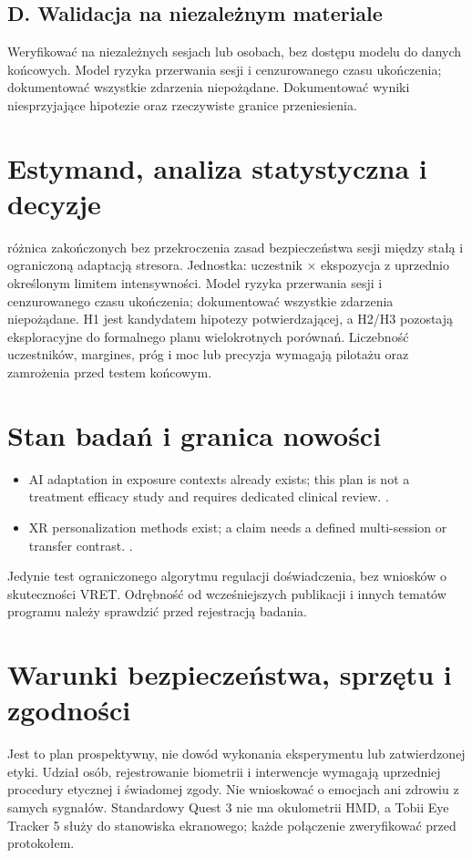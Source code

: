 \documentclass[11pt,a4paper]{article}
\begin{document}
\subsection{D. Walidacja na niezależnym materiale}
Weryfikować na niezależnych sesjach lub osobach, bez dostępu modelu do danych końcowych. Model ryzyka przerwania sesji i cenzurowanego czasu ukończenia; dokumentować wszystkie zdarzenia niepożądane. Dokumentować wyniki niesprzyjające hipotezie oraz rzeczywiste granice przeniesienia.
\section{Estymand, analiza statystyczna i decyzje}
różnica zakończonych bez przekroczenia zasad bezpieczeństwa sesji między stałą i ograniczoną adaptacją stresora. Jednostka: uczestnik × ekspozycja z uprzednio określonym limitem intensywności. Model ryzyka przerwania sesji i cenzurowanego czasu ukończenia; dokumentować wszystkie zdarzenia niepożądane. H1 jest kandydatem hipotezy potwierdzającej, a H2/H3 pozostają eksploracyjne do formalnego planu wielokrotnych porównań. Liczebność uczestników, margines, próg i moc lub precyzja wymagają pilotażu oraz zamrożenia przed testem końcowym.
\section{Stan badań i granica nowości}
\begin{itemize}
\item AI adaptation in exposure contexts already exists; this plan is not a treatment efficacy study and requires dedicated clinical review. \cite{xrprior1}.
\item XR personalization methods exist; a claim needs a defined multi-session or transfer contrast. \cite{xrprior2}.
\end{itemize}
Jedynie test ograniczonego algorytmu regulacji doświadczenia, bez wniosków o skuteczności VRET. Odrębność od wcześniejszych publikacji i innych tematów programu należy sprawdzić przed rejestracją badania.
\section{Warunki bezpieczeństwa, sprzętu i zgodności}
Jest to plan prospektywny, nie dowód wykonania eksperymentu lub zatwierdzonej etyki. Udział osób, rejestrowanie biometrii i interwencje wymagają uprzedniej procedury etycznej i świadomej zgody. Nie wnioskować o emocjach ani zdrowiu z samych sygnałów. Standardowy Quest 3 nie ma okulometrii HMD, a Tobii Eye Tracker 5 służy do stanowiska ekranowego; każde połączenie zweryfikować przed protokołem.
\end{document}
